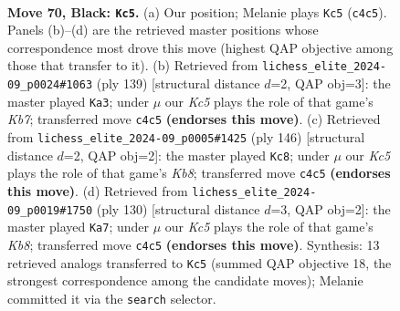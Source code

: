 \documentclass[11pt]{article}
\begin{document}
\clearpage

\begin{figure}[p]\centering
\begin{subfigure}{0.46\textwidth}\centering
\resizebox{\linewidth}{!}{%
\newchessgame
\chessboard[
  setfen={1Q6/6P1/8/4P2P/2k5/8/2K5/8 b - - 0 70},
  showmover=false,
  pgfstyle=straightmove, color=movearrow, markmove={c4-c5}
]}
\caption{}
\end{subfigure}\hfill
\begin{subfigure}{0.46\textwidth}\centering
\resizebox{\linewidth}{!}{%
\newchessgame
\chessboard[
  setfen={8/2Q5/8/8/5P2/3K4/1k5P/8 b - - 0 70},
  showmover=false,
  pgfstyle=straightmove, color=movearrow, markmove={b2-a3}
]}
\caption{}
\end{subfigure}
\\[4pt]
\begin{subfigure}{0.46\textwidth}\centering
\resizebox{\linewidth}{!}{%
\newchessgame
\chessboard[
  setfen={1K6/4q3/2k3p1/4p3/8/8/8/8 w - - 6 74},
  showmover=false,
  pgfstyle=straightmove, color=movearrow, markmove={b8-c8}
]}
\caption{}
\end{subfigure}\hfill
\begin{subfigure}{0.46\textwidth}\centering
\resizebox{\linewidth}{!}{%
\newchessgame
\chessboard[
  setfen={1K6/4k3/2q5/7p/8/5p2/8/8 w - - 2 66},
  showmover=false,
  pgfstyle=straightmove, color=movearrow, markmove={b8-a7}
]}
\caption{}
\end{subfigure}
\caption{\textbf{Move 70, Black: \texttt{Kc5}.} (a) Our position; Melanie plays \texttt{Kc5} (\texttt{c4c5}). Panels (b)--(d) are the retrieved master positions whose correspondence most drove this move (highest QAP objective among those that transfer to it). (b) Retrieved from \texttt{lichess\_elite\_2024-09\_p0024\#1063} (ply 139) [structural distance $d$=2, QAP obj=3]: the master played \texttt{Ka3}; under $\mu$ our \emph{Kc5} plays the role of that game's \emph{Kb7}; transferred move \texttt{c4c5} \textbf{(endorses this move)}. (c) Retrieved from \texttt{lichess\_elite\_2024-09\_p0005\#1425} (ply 146) [structural distance $d$=2, QAP obj=2]: the master played \texttt{Kc8}; under $\mu$ our \emph{Kc5} plays the role of that game's \emph{Kb8}; transferred move \texttt{c4c5} \textbf{(endorses this move)}. (d) Retrieved from \texttt{lichess\_elite\_2024-09\_p0019\#1750} (ply 130) [structural distance $d$=3, QAP obj=2]: the master played \texttt{Ka7}; under $\mu$ our \emph{Kc5} plays the role of that game's \emph{Kb8}; transferred move \texttt{c4c5} \textbf{(endorses this move)}. Synthesis: 13 retrieved analogs transferred to \texttt{Kc5} (summed QAP objective 18, the strongest correspondence among the candidate moves); Melanie committed it via the \texttt{search} selector.}
\label{fig:thought-m139}
\end{figure}
\end{document}
